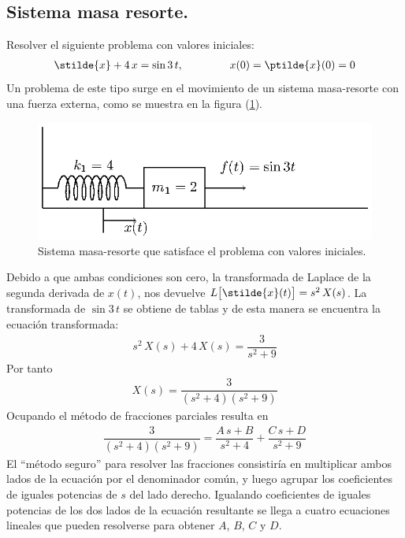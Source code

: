 \subsection{Sistema masa resorte.}

Resolver el siguiente problema con valores iniciales:
\begin{align*}
\stilde{x} + 4 \, x =  \sin 3 \, t, \hspace{1.5cm} x(0) = \ptilde{x}(0) = 0
\end{align*}
Un problema de este tipo surge en el movimiento de un sistema masa-resorte con una fuerza externa, como se muestra en la figura (\ref{fig:figura_07_02_02}).
\begin{figure}[H]
    \centering
    \includegraphics[scale=1.3]{Imagenes/sist_masa_resorte.eps}
    \caption{Sistema masa-resorte que satisface el problema con valores iniciales.}
    \label{fig:figura_07_02_02}
\end{figure}
Debido a que ambas condiciones son cero, la transformada de Laplace de la segunda derivada de $x(t)$, nos devuelve $L \big[\stilde{x} (t)\big] = s^{2} \, X(s) $. La transformada de $\sin 3 \, t$ se obtiene de tablas y de esta manera se encuentra la ecuación transformada:
\begin{align*}
s^{2} \, X(s) + 4 \, X(s) = \dfrac{3}{s^{2} + 9}
\end{align*}
Por tanto
\begin{align*}
X(s) = \dfrac{3}{(s^{2} + 4)(s^{2} + 9)}
\end{align*}
Ocupando el método de fracciones parciales resulta en
\begin{align*}
\dfrac{3}{(s^{2} + 4)(s^{2} + 9)} = \dfrac{A \, s + B}{s^{2} + 4} + \dfrac{C \, s +D}{s^{2} + 9}
\end{align*}
El \enquote{método seguro} para resolver las fracciones consistiría en multiplicar ambos lados de la ecuación por el denominador común, y luego agrupar los coeficientes de iguales potencias de $s$ del lado derecho. Igualando coeficientes de iguales potencias de los dos lados de la ecuación resultante se llega a cuatro ecuaciones lineales que pueden resolverse para obtener $A$, $B$, $C$ y $D$.
